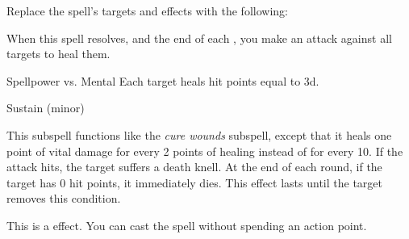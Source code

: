 Replace the spell's targets and effects with the following:
\begin{spellcontent}
\begin{augmenttargetinginfo}
\end{augmenttargetinginfo}
\begin{augmenteffects}
\spelleffect
When this spell resolves, and the end of each , you make an attack against all targets to heal them.
\begin{spellattack}{Spellpower vs. Mental}
\spellsuccess
Each target heals hit points equal to  \minus3d.
\end{spellattack}
\spelldur Sustain (minor)
\end{augmenteffects}
\end{spellcontent}
This subspell functions like the \textit{cure wounds} subspell, except that it heals one point of vital damage for every 2 points of healing instead of for every 10.
If the attack hits, the target suffers a death knell.
At the end of each round, if the target has 0 hit points, it immediately dies.
This effect lasts until the target removes this condition.
\par
This is a  effect.
You can cast the spell without spending an action point.